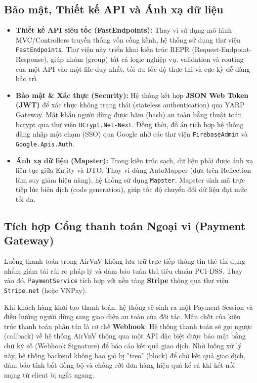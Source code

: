 \subsection{Bảo mật, Thiết kế API và Ánh xạ dữ liệu}
\label{subsec:security_mapping}

\begin{itemize}
    \item \textbf{Thiết kế API siêu tốc (FastEndpoints):} Thay vì sử dụng mô hình MVC/Controllers truyền thống vốn
    cồng kềnh, hệ thống sử dụng thư viện \texttt{FastEndpoints}. Thư viện này triển khai kiến trúc REPR
    (Request-Endpoint-Response), giúp nhóm (group) tất cả logic nghiệp vụ, validation và routing của một API vào một file duy nhất,
    tối ưu tốc độ thực thi và cực kỳ dễ dàng bảo trì.
    
    \item \textbf{Bảo mật \& Xác thực (Security):} Hệ thống kết hợp \textbf{JSON Web Token (JWT)} để xác thực không
    trạng thái (stateless authentication) qua YARP Gateway. Mật khẩu người dùng được băm (hash) an toàn bằng thuật toán bcrypt qua thư viện
    \texttt{BCrypt.Net-Next}. Đồng thời, đồ án tích hợp hệ thống đăng nhập một chạm (SSO) qua Google nhờ các thư viện
    \texttt{FirebaseAdmin} và \texttt{Google.Apis.Auth}.
    
    \item \textbf{Ánh xạ dữ liệu (Mapster):} Trong kiến trúc sạch, dữ liệu phải được ánh xạ liên tục giữa Entity và DTO. 
    Thay vì dùng AutoMapper (dựa trên Reflection làm suy giảm hiệu năng), hệ thống sử dụng \texttt{Mapster}.
    Mapster sinh mã trực tiếp lúc biên dịch (code generation), giúp tốc độ chuyển đổi dữ liệu đạt mức tối đa.
\end{itemize}

\subsection{Tích hợp Cổng thanh toán Ngoại vi (Payment Gateway)}
\label{subsec:payment_gateway}

Luồng thanh toán trong AirVnV không lưu trữ trực tiếp thông tin thẻ tín dụng nhằm giảm tải rủi ro pháp lý và
đảm bảo tuân thủ tiêu chuẩn PCI-DSS. Thay vào đó, \texttt{PaymentService} tích hợp với nền tảng \textbf{Stripe} thông qua thư viện \texttt{Stripe.net} (hoặc VNPay).

Khi khách hàng khởi tạo thanh toán, hệ thống sẽ sinh ra một Payment Session và điều hướng người dùng sang giao diện an toàn của đối tác.
Mấu chốt của kiến trúc thanh toán phân tán là cơ chế \textbf{Webhook}: Hệ thống thanh toán sẽ gọi ngược (callback)
về hệ thống AirVnV thông qua một API đặc biệt được bảo mật bằng chữ ký số (Webhook Signature) để báo cáo kết quả giao dịch.
Nhờ luồng xử lý này, hệ thống backend không bao giờ bị "treo" (block) để chờ kết quả giao dịch, đảm bảo tính bất đồng bộ 
và chống rớt đơn hàng hiệu quả kể cả khi kết nối mạng từ client bị ngắt ngang.
